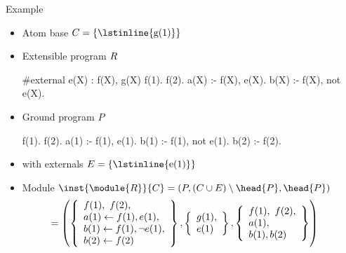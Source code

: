 \begin{frame}[fragile]{Example}
  \begin{itemize}
  \item<1-> Atom base $C=\{\text{\lstinline{g(1)}}\}$
  \item<only@1,4> Extensible program $R$
    \begin{semiverbatim}
  #external e(X) : f(X), g(X)
  f(1). f(2).
  a(X) :- f(X), e(X).
  b(X) :- f(X), not e(X).
    \end{semiverbatim}
    \vspace{-10pt}
  \item<only@2-3> Ground program $P$
    \begin{semiverbatim}
  f(1). f(2).
  a(1) :- f(1), e(1).
  b(1) :- f(1), not e(1).   b(2) :- f(2).
    \end{semiverbatim}
    \vspace{-13pt}
  \item<only@2-3>[] with externals $E=\{\text{\lstinline{e(1)}}\}$
  \item<3-> Module
    \(
    \inst{\module{\RRG}}{C}=(P,(C\cup E)\setminus\head{P},\head{P})
    \)
    \[
    \hspace{-15pt}
    {} =
    \left(
      \left\{
        \begin{array}{l}
          f(1), \  f(2), \\
          a(1) \leftarrow f(1), e(1),\\
          b(1) \leftarrow f(1), \neg e(1),\\
          b(2) \leftarrow f(2)
        \end{array}
      \right\}
      ,
      \left\{
        \begin{array}[l]{l}
          g(1),\\e(1)
        \end{array}
      \right\}
      ,
      \left\{
        \begin{array}[l]{l}
          f(1), \  f(2), \\
          a(1),\\
          b(1), b(2)
        \end{array}
      \right\}
    \right)
    \]
  \end{itemize}
\end{frame}
